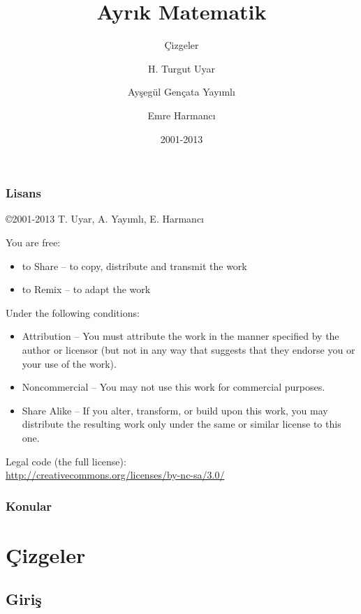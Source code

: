 \documentclass[dvipsnames]{beamer}
\title{Ayrık Matematik}
\subtitle{Çizgeler}
\author{H. Turgut Uyar \and Ayşegül Gençata Yayımlı \and Emre Harmancı}
\date{2001-2013}
\theoremstyle{definition}
\theoremstyle{example}
\theoremstyle{plain}
\begin{document}
\begin{frame}
  \titlepage
\end{frame}

\begin{frame}
  \frametitle{Lisans}

  \hfill
  \copyright 2001-2013 T. Uyar, A. Yayımlı, E. Harmancı

  \vfill
  \begin{tiny}
    You are free:
    \begin{itemize}
      \item to Share -- to copy, distribute and transmit the work
      \item to Remix -- to adapt the work
    \end{itemize}

    Under the following conditions:
    \begin{itemize}
      \item Attribution -- You must attribute the work in the manner specified by
        the author or licensor (but not in any way that suggests that they
        endorse you or your use of the work).

      \item Noncommercial -- You may not use this work for commercial purposes.

      \item Share Alike -- If you alter, transform, or build upon this work, you
        may distribute the resulting work only under the same or similar license
        to this one.
    \end{itemize}
  \end{tiny}

  \vfill
  Legal code (the full license):\\
  \url{http://creativecommons.org/licenses/by-nc-sa/3.0/}
\end{frame}

\begin{frame}
  \frametitle{Konular}
  \tableofcontents
\end{frame}

\section{Çizgeler}

\subsection{Giriş}
\end{document}
